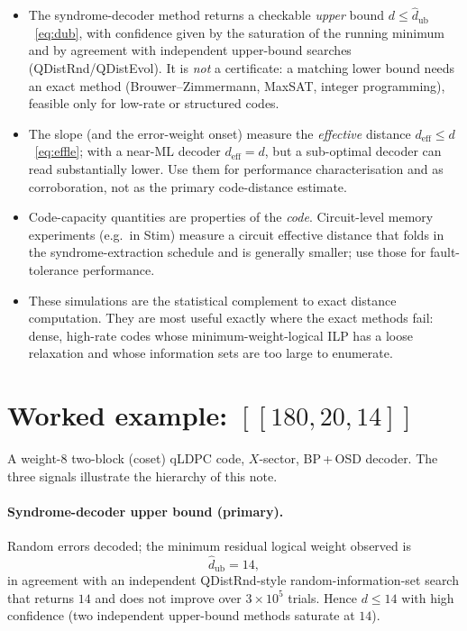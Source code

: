 \documentclass[11pt]{article}
\newcommand{\dub}{\hat d_{\mathrm{ub}}}
\newcommand{\deff}{d_{\mathrm{eff}}}
\begin{document}
\begin{itemize}
\item The syndrome-decoder method returns a checkable \emph{upper} bound
$d\le\dub$~\eqref{eq:dub}, with confidence given by the saturation of the running
minimum and by agreement with independent upper-bound searches
(QDistRnd/QDistEvol). It is \emph{not} a certificate: a matching lower bound needs
an exact method (Brouwer--Zimmermann, MaxSAT, integer programming), feasible only
for low-rate or structured codes.
\item The slope (and the error-weight onset) measure the \emph{effective} distance
$\deff\le d$~\eqref{eq:effle}; with a near-ML decoder $\deff=d$, but a sub-optimal
decoder can read substantially lower. Use them for performance characterisation
and as corroboration, not as the primary code-distance estimate.
\item Code-capacity quantities are properties of the \emph{code}. Circuit-level
memory experiments (e.g.\ in Stim) measure a circuit effective distance that folds
in the syndrome-extraction schedule and is generally smaller; use those for
fault-tolerance performance.
\item These simulations are the statistical complement to exact distance
computation. They are most useful exactly where the exact methods fail: dense,
high-rate codes whose minimum-weight-logical ILP has a loose relaxation and whose
information sets are too large to enumerate.
\end{itemize}

\appendix
\section{Worked example: $[[180,20,14]]$}
\label{app:example}
A weight-$8$ two-block (coset) qLDPC code, $X$-sector, BP\,+\,OSD decoder. The
three signals illustrate the hierarchy of this note.

\paragraph{Syndrome-decoder upper bound (primary).} Random errors decoded; the
minimum residual logical weight observed is
\[
  \dub = 14,
\]
in agreement with an independent QDistRnd-style random-information-set search that
returns $14$ and does not improve over $3\times10^5$ trials. Hence $d\le 14$ with
high confidence (two independent upper-bound methods saturate at $14$).
\end{document}
